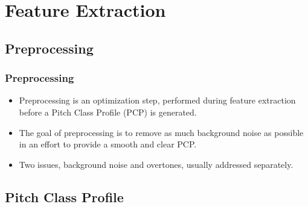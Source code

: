 \documentclass{beamer}
\begin{document}
\section[Feature Extraction]{Feature Extraction}


\subsection{Preprocessing}

\begin{frame}
	\frametitle{Preprocessing}
	
	\begin{itemize}
		\item Preprocessing is an optimization step, performed during feature extraction before a Pitch Class Profile (PCP) is generated.
		\item The goal of preprocessing is to remove as much background noise as possible in an effort to provide a smooth and clear PCP.
		\item Two issues, background noise and overtones, usually addressed separately.
	\end{itemize}
\end{frame}	

\subsection{Pitch Class Profile}
\end{document}

